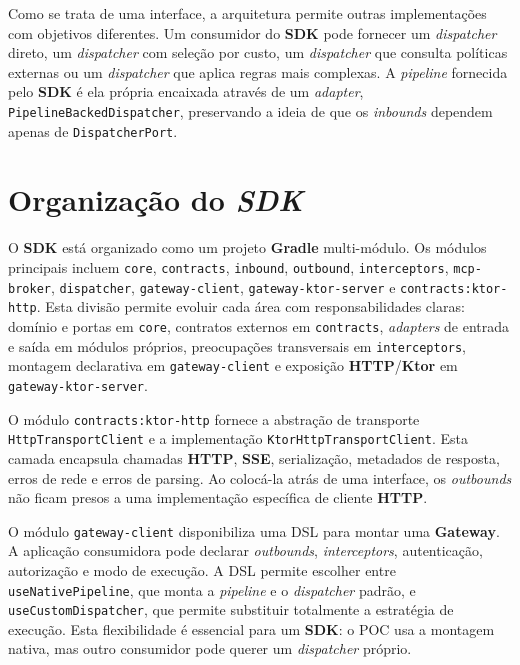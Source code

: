     Como se trata de uma interface, a arquitetura permite outras implementações com objetivos diferentes. Um consumidor do \textbf{SDK} pode fornecer um \textit{dispatcher} direto, um \textit{dispatcher} com seleção por custo, um \textit{dispatcher} que consulta políticas externas ou um \textit{dispatcher} que aplica regras mais complexas. A \textit{pipeline} fornecida pelo \textbf{SDK} é ela própria encaixada através de um \textit{adapter}, \texttt{PipelineBackedDispatcher}, preservando a ideia de que os \textit{inbounds} dependem apenas de \texttt{DispatcherPort}.

    \section{Organização do \textit{\textbf{SDK}}}
    O \textbf{SDK} está organizado como um projeto \textbf{Gradle} multi-módulo. Os módulos principais incluem \texttt{core}, \texttt{contracts}, \texttt{inbound}, \texttt{outbound}, \texttt{interceptors}, \texttt{mcp-broker}, \texttt{dispatcher}, \texttt{gateway-client}, \texttt{gateway-ktor-server} e \texttt{contracts:ktor-http}. Esta divisão permite evoluir cada área com responsabilidades claras: domínio e portas em \texttt{core}, contratos externos em \texttt{contracts}, \textit{adapters} de entrada e saída em módulos próprios, preocupações transversais em \texttt{interceptors}, montagem declarativa em \texttt{gateway-client} e exposição \textbf{HTTP}/\textbf{Ktor} em \texttt{gateway-ktor-server}.

    O módulo \texttt{contracts:ktor-http} fornece a abstração de transporte \texttt{HttpTransportClient} e a implementação \texttt{KtorHttpTransportClient}. Esta camada encapsula chamadas \textbf{HTTP}, \textbf{SSE}, serialização, metadados de resposta, erros de rede e erros de parsing. Ao colocá-la atrás de uma interface, os \textit{outbounds} não ficam presos a uma implementação específica de cliente \textbf{HTTP}.

    O módulo \texttt{gateway-client} disponibiliza uma DSL para montar uma \textbf{Gateway}. A aplicação consumidora pode declarar \textit{outbounds}, \textit{interceptors}, autenticação, autorização e modo de execução. A DSL permite escolher entre \texttt{useNativePipeline}, que monta a \textit{pipeline} e o \textit{dispatcher} padrão, e \texttt{useCustomDispatcher}, que permite substituir totalmente a estratégia de execução. Esta flexibilidade é essencial para um \textbf{SDK}: o POC usa a montagem nativa, mas outro consumidor pode querer um \textit{dispatcher} próprio.

